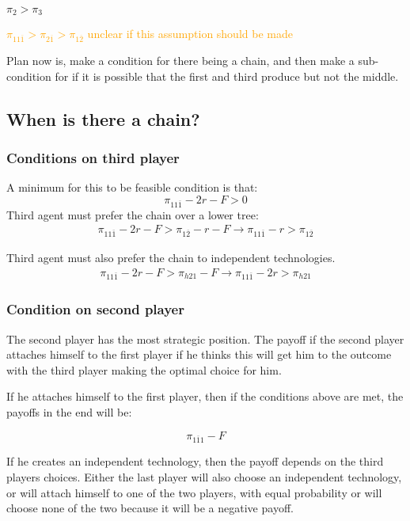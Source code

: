 \documentclass{article}
\begin{document}
$\pi_{2}>\pi_{3}$

\textcolor{orange}{$\pi_{11 \overline{1}}>\pi_{2 \overline{1}}>\pi_{1 \overline{2}}$ unclear if this assumption should be made}

Plan now is, make a condition for there being a chain, and then make a sub-condition for if it is possible that the first and third produce but not the middle. 

\subsection{When is there a chain?}

\subsubsection{Conditions on third player}
A minimum for this to be feasible condition is that:
\begin{equation*}
        \pi_{11 \overline{1}}-2r-F>0
\end{equation*}
Third agent must prefer the chain over a lower tree:
\begin{align*}
    \pi_{11 \overline{1}}-2r-F>\pi_{1 \overline{2}}-r-F \rightarrow \pi_{11 \overline{1}}-r>\pi_{1 \overline{2}} 
\end{align*}

Third agent must also prefer the chain to independent technologies. 
\begin{align*}
    \pi_{11 \overline{1}}-2r-F>\pi_{h21}-F \rightarrow \pi_{11 \overline{1}}-2r>\pi_{h21} 
\end{align*}

\subsubsection{Condition on second player}

The second player has the most strategic position. The payoff if the second player attaches himself to the first player if he thinks this will get him to the outcome with the third player making the optimal choice for him. 

If he attaches himself to the first player, then if the conditions above are met, the payoffs in the end will be:

\begin{equation*}
\pi_{1 \overline{1}1}-F
\end{equation*}

If he creates an independent technology, then the payoff depends on the third players choices. Either the last player will also choose an independent technology, or will attach himself to one of the two players, with equal probability or will choose none of the two because it will be a negative payoff. 
\end{document}
